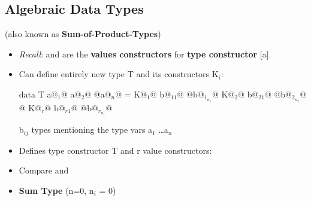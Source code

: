 
\subsection{Algebraic Data Types}
(also known as \textbf{Sum-of-Product-Types})

\begin{itemize}
  \item \textit{Recall}: \codeline{[]} and \codeline{(:)} are the \textbf{values constructors} for \textbf{type constructor} [a]. 
  \item Can define entirely new type T and its constructors K$_i$:\\
        \begin{Haskell}
data T a@$_1$@ a@$_2$@ @\dots@ a@$_n$@ = K@$_1$@ b@$_{11}$@ @\dots@ b@$_{1_{n_1}}$@
                     K@$_2$@ b@$_{21}$@ @\dots@ b@$_{2_{n_2}}$@
                     @\dots@
                     K@$_r$@ b@$_{r1}$@ @\dots@ b@$_{r_{n_r}}$@
        \end{Haskell}
        
        b$_{ij}$ types mentioning the type vars a$_1$ \dots a$_n$

  \item Defines type constructor T and r value constructors:\\
  \item Compare \codeline{[] :: [a]} and 
  \item \textbf{Sum Type} (n=0, n$_i$ = 0) \\


\end{itemize}
